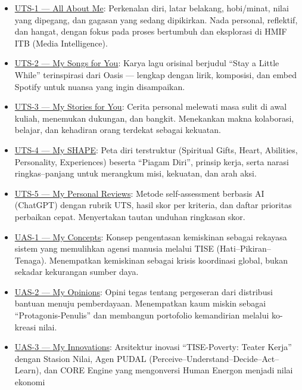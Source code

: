 \documentclass[
  letterpaper,
  DIV=11,
  numbers=noendperiod]{scrreprt}
\begin{document}
\begin{itemize}
\item
  \hyperref[uts-1-all-about-me]{UTS-1 --- All About Me}: Perkenalan
  diri, latar belakang, hobi/minat, nilai yang dipegang, dan gagasan
  yang sedang dipikirkan. Nada personal, reflektif, dan hangat, dengan
  fokus pada proses bertumbuh dan eksplorasi di HMIF ITB (Media
  Intelligence).
\item
  \hyperref[uts-2-my-songs-for-you]{UTS-2 --- My Songs for You}: Karya
  lagu orisinal berjudul ``Stay a Little While'' terinspirasi dari Oasis
  --- lengkap dengan lirik, komposisi, dan embed Spotify untuk nuansa
  yang ingin disampaikan.
\item
  \hyperref[uts-3-my-stories-for-you-uxe51uxe51]{UTS-3 --- My Stories
  for You}: Cerita personal melewati masa sulit di awal kuliah,
  menemukan dukungan, dan bangkit. Menekankan makna kolaborasi, belajar,
  dan kehadiran orang terdekat sebagai kekuatan.
\item
  \hyperref[uts-4-my-shape-spiritual-gifts-heart-abilities-personality-experiences-ux3063]{UTS-4
  --- My SHAPE}: Peta diri terstruktur (Spiritual Gifts, Heart,
  Abilities, Personality, Experiences) beserta ``Piagam Diri'', prinsip
  kerja, serta narasi ringkas--panjang untuk merangkum misi, kekuatan,
  dan arah aksi.
\item
  \hyperref[uts-5-my-personal-reviews-uxe51ux3142ux648]{UTS-5 --- My
  Personal Reviews}: Metode self-assessment berbasis AI (ChatGPT) dengan
  rubrik UTS, hasil skor per kriteria, dan daftar prioritas perbaikan
  cepat. Menyertakan tautan unduhan ringkasan skor.
\item
  \hyperref[uas-1-my-concepts-ux3145]{UAS-1 --- My Concepts}: Konsep
  pengentasan kemiskinan sebagai rekayasa sistem yang memulihkan agensi
  manusia melalui TISE (Hati--Pikiran--Tenaga). Menempatkan kemiskinan
  sebagai krisis koordinasi global, bukan sekadar kekurangan sumber
  daya.
\item
  \hyperref[uas-2-my-opinions-ux669ux2caux15dcux2cb-ux648]{UAS-2 --- My
  Opinions}: Opini tegas tentang pergeseran dari distribusi bantuan
  menuju pemberdayaan. Menempatkan kaum miskin sebagai
  ``Protagonis-Penulis'' dan membangun portofolio kemandirian melalui
  ko-kreasi nilai.
\item
  \hyperref[uas-3-my-innovations-ux1d54ux15dcux1d54]{UAS-3 --- My
  Innovations}: Arsitektur inovasi ``TISE-Poverty: Teater Kerja'' dengan
  Stasion Nilai, Agen PUDAL (Perceive--Understand--Decide--Act--Learn),
  dan CORE Engine yang mengonversi Human Energon menjadi nilai ekonomi

\end{itemize}
\end{document}
